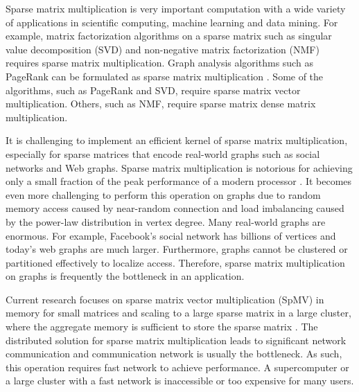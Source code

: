 Sparse matrix multiplication is very important computation with a wide variety
of applications in scientific computing, machine learning and data mining.
For example, matrix factorization algorithms on a sparse matrix such as
singular value decomposition (SVD) \cite{svd} and non-negative matrix
factorization (NMF) \cite{nmf} requires sparse matrix multiplication.
Graph analysis algorithms such as PageRank \cite{pagerank} can be
formulated as sparse matrix multiplication \cite{Mattson13}. Some of
the algorithms, such as PageRank and SVD, require sparse matrix vector
multiplication. Others, such as NMF, require sparse matrix dense
matrix multiplication.


It is challenging to implement an efficient kernel of sparse matrix
multiplication, especially for sparse matrices that encode real-world graphs
such as social networks
and Web graphs. Sparse matrix multiplication is notorious for achieving only
a small fraction of the peak performance of a modern processor \cite{Williams07}.
It becomes even more challenging to perform this operation on graphs due to
random memory access caused by near-random connection and load imbalancing
caused by the power-law distribution in vertex degree. Many real-world graphs
are enormous. For example, Facebook's social network has billions of vertices
and today's web graphs are much larger. Furthermore, graphs cannot be
clustered or partitioned effectively \cite{leskovec} to localize access.
Therefore, sparse matrix multiplication on graphs is frequently the bottleneck
in an application.

Current research focuses on sparse matrix vector multiplication (SpMV) in memory
for small matrices and scaling to a large sparse matrix in a large cluster,
where the aggregate memory is sufficient to store the sparse matrix
\cite{Williams07, Yoo11, Boman2013}.
The distributed solution for sparse matrix multiplication leads to significant
network communication and communication network is usually the bottleneck.
As such, this operation requires fast network to achieve performance.
A supercomputer or a large cluster with a fast network is inaccessible or
too expensive for many users.



